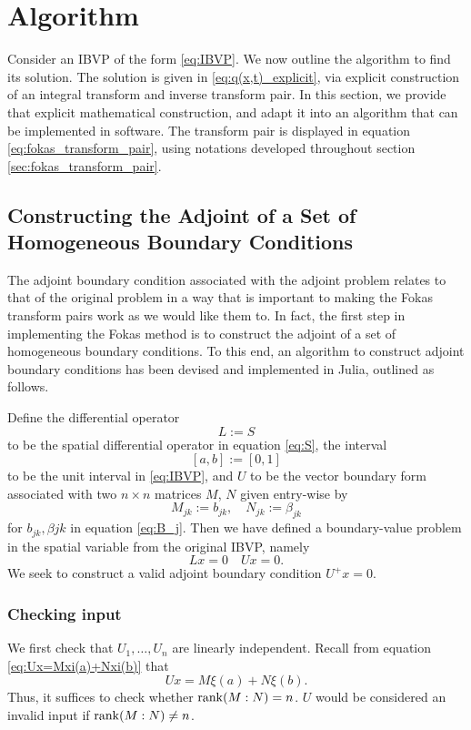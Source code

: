 \documentclass[11pt, oneside, a4paper]{article}
\begin{document}
\section{Algorithm}

Consider an IBVP of the form \eqref{eq:IBVP}. We now outline the algorithm to find its solution. The solution is given in \ref{eq:q(x,t)_explicit}, via explicit construction of an integral transform and inverse transform pair. In this section, we provide that explicit mathematical construction, and adapt it into an algorithm that can be implemented in software. The transform pair is displayed in equation \eqref{eq:fokas_transform_pair}, using notations developed throughout section \ref{sec:fokas_transform_pair}.

\subsection{Constructing the Adjoint of a Set of Homogeneous Boundary Conditions}\label{sec:construct_adjoint}

The adjoint boundary condition associated with the adjoint problem relates to that of the original problem in a way that is important to making the Fokas transform pairs work as we would like them to. In fact, the first step in implementing the Fokas method is to construct the adjoint of a set of homogeneous boundary conditions. To this end, an algorithm to construct adjoint boundary conditions has been devised and implemented in Julia, outlined as follows.

Define the differential operator 
\[L := S\]
to be the spatial differential operator in equation \eqref{eq:S},
the interval 
\[[a,b] := [0,1]\]
to be the unit interval in \eqref{eq:IBVP}, and $U$ to be the vector boundary form associated with two $n\times n$ matrices $M$, $N$ given entry-wise by 
\[M_{jk} := b_{jk},\quad N_{jk} := \beta_{jk}\]
for $b_{jk}, \beta{jk}$ in equation \eqref{eq:B_j}.
Then we have defined a boundary-value problem in the spatial variable from the original IBVP, namely
\[Lx=0\quad Ux=0.\]
We seek to construct a valid adjoint boundary condition $U^+x=0$.

\subsubsection{Checking input}
We first check that $U_1,\ldots, U_n$ are linearly independent. Recall from equation \eqref{eq:Ux=Mxi(a)+Nxi(b)} that
\[Ux = M\xi(a) + N\xi(b).\]
Thus, it suffices to check whether $\operatorname{rank}(M:N)=n$. $U$ would be considered an invalid input if $\operatorname{rank}(M:N)\neq n$.
\end{document}
